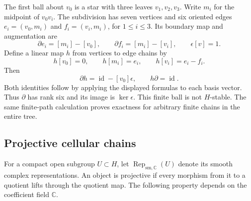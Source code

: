 \begin{example}[The first ball when $q=2$]\label{v4-arith:w10-d:fixed-center:ex:star}
The first ball about $v_0$ is a star with three leaves $v_1,v_2,v_3$.
Write $m_i$ for the midpoint of $v_0v_i$.
The subdivision has seven vertices and six oriented edges
$e_i=(v_0,m_i)$ and $f_i=(v_i,m_i)$, for $1\le i\le3$.
Its boundary map and augmentation are
\[
 \partial e_i=[m_i]-[v_0],\qquad
 \partial f_i=[m_i]-[v_i],\qquad
 \epsilon[v]=1.
\]
Define a linear map $h$ from vertices to edge chains by
\[
 h[v_0]=0,\qquad h[m_i]=e_i,\qquad h[v_i]=e_i-f_i.
\]
Then
\[
 \partial h=\operatorname{id}-[v_0]\epsilon,\qquad h\partial=\operatorname{id}.
\]
Both identities follow by applying the displayed formulas to each basis vector.
Thus $\partial$ has rank six and its image is $\ker\epsilon$.
This finite ball is not $H$-stable.
The same finite-path calculation proves exactness for arbitrary finite chains in the entire tree.
\end{example}

\subsection{Projective cellular chains}

For a compact open subgroup $U\subset H$, let $\operatorname{Rep}_{\mathrm{sm},\mathbb C}(U)$ denote its smooth complex representations.
An object is projective if every morphism from it to a quotient lifts through the quotient map.
The following property depends on the coefficient field $\mathbb C$.

